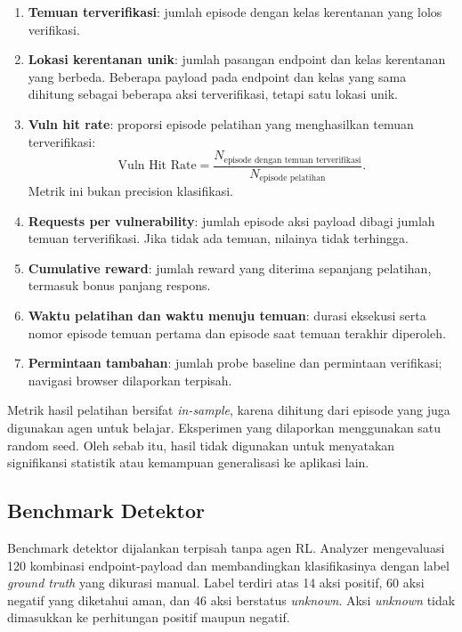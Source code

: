 \begin{enumerate}
    \item \textbf{Temuan terverifikasi}: jumlah episode dengan kelas kerentanan yang lolos verifikasi.
    \item \textbf{Lokasi kerentanan unik}: jumlah pasangan endpoint dan kelas kerentanan yang berbeda. Beberapa payload pada endpoint dan kelas yang sama dihitung sebagai beberapa aksi terverifikasi, tetapi satu lokasi unik.
    \item \textbf{Vuln hit rate}: proporsi episode pelatihan yang menghasilkan temuan terverifikasi:
    \begin{equation}
    \text{Vuln Hit Rate} =
    \frac{N_{\text{episode dengan temuan terverifikasi}}}
    {N_{\text{episode pelatihan}}}.
    \end{equation}
    Metrik ini bukan precision klasifikasi.
    \item \textbf{Requests per vulnerability}: jumlah episode aksi payload dibagi jumlah temuan terverifikasi. Jika tidak ada temuan, nilainya tidak terhingga.
    \item \textbf{Cumulative reward}: jumlah reward yang diterima sepanjang pelatihan, termasuk bonus panjang respons.
    \item \textbf{Waktu pelatihan dan waktu menuju temuan}: durasi eksekusi serta nomor episode temuan pertama dan episode saat temuan terakhir diperoleh.
    \item \textbf{Permintaan tambahan}: jumlah probe baseline dan permintaan verifikasi; navigasi browser dilaporkan terpisah.
\end{enumerate}

Metrik hasil pelatihan bersifat \textit{in-sample}, karena dihitung dari episode yang juga digunakan agen untuk belajar. Eksperimen yang dilaporkan menggunakan satu random seed. Oleh sebab itu, hasil tidak digunakan untuk menyatakan signifikansi statistik atau kemampuan generalisasi ke aplikasi lain.

\subsection{Benchmark Detektor}

Benchmark detektor dijalankan terpisah tanpa agen RL. Analyzer mengevaluasi 120 kombinasi endpoint-payload dan membandingkan klasifikasinya dengan label \textit{ground truth} yang dikurasi manual. Label terdiri atas 14 aksi positif, 60 aksi negatif yang diketahui aman, dan 46 aksi berstatus \textit{unknown}. Aksi \textit{unknown} tidak dimasukkan ke perhitungan positif maupun negatif.

